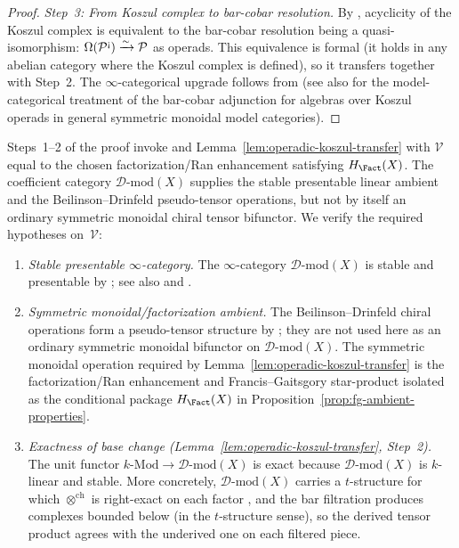 \begin{proof}
\emph{Step~3: From Koszul complex to bar-cobar resolution.}
By \cite[Theorem~11.3.3]{LV12}, acyclicity of the Koszul complex
is equivalent to the bar-cobar resolution being a quasi-isomorphism:
$\Omega(\mathcal{P}^{\text{\textexclamdown}}) \xrightarrow{\sim}
\mathcal{P}$ as operads. This equivalence is formal
(it holds in any abelian category where the Koszul complex is
defined), so it transfers together with Step~2.
The $\infty$-categorical upgrade follows from
\cite[Theorem~11.4.1]{LV12} (see also
\cite[§16]{Fresse-operads} for the model-categorical treatment
of the bar-cobar adjunction for algebras over Koszul operads in
general symmetric monoidal model categories).
\end{proof}

\begin{remark}\label{rem:e1-koszul-hypotheses}
Steps~1--2 of the proof invoke \cite[Theorem~11.4.1]{LV12} and
Lemma~\ref{lem:operadic-koszul-transfer} with
$\mathcal{V}$ equal to the chosen factorization/Ran enhancement
satisfying $H_{\Fact}(X)$. The coefficient category
$\mathcal{D}\text{-mod}(X)$ supplies the stable presentable
linear ambient and the Beilinson--Drinfeld pseudo-tensor operations,
but not by itself an ordinary symmetric monoidal chiral tensor
bifunctor. We verify the required hypotheses on~$\mathcal{V}$:
\begin{enumerate}
\item \emph{Stable presentable $\infty$-category.}
The $\infty$-category $\mathcal{D}\text{-mod}(X)$ is stable and
presentable by \cite[Chapter~I.3]{GR17}; see also
\cite[Proposition~5.5.3.6]{HA} and \cite[§1.1]{HA}.
\item \emph{Symmetric monoidal/factorization ambient.}
The Beilinson--Drinfeld chiral operations form a pseudo-tensor
structure by \cite[\S3.4]{BD04}; they are not used here as an
ordinary symmetric monoidal bifunctor on $\mathcal{D}\text{-mod}(X)$.
The symmetric monoidal operation required by
Lemma~\ref{lem:operadic-koszul-transfer} is the factorization/Ran
enhancement and Francis--Gaitsgory star-product isolated as the conditional
package $H_{\Fact}(X)$ in
Proposition~\ref{prop:fg-ambient-properties}.
\item \emph{Exactness of base change
\textup{(}Lemma~\textup{\ref{lem:operadic-koszul-transfer}},
Step~\textup{2)}.}
The unit functor $k\text{-}\mathrm{Mod} \to \mathcal{D}\text{-mod}(X)$
is exact because $\mathcal{D}\text{-mod}(X)$ is $k$-linear and
stable. More concretely, $\mathcal{D}\text{-mod}(X)$ carries a
$t$-structure for which $\otimes^{\mathrm{ch}}$ is right-exact on each
factor \cite[3.4.12]{BD04}, and the bar filtration produces complexes
bounded below (in the $t$-structure sense), so the derived tensor
product agrees with the underived one on each filtered piece.
\end{enumerate}
\end{remark}

